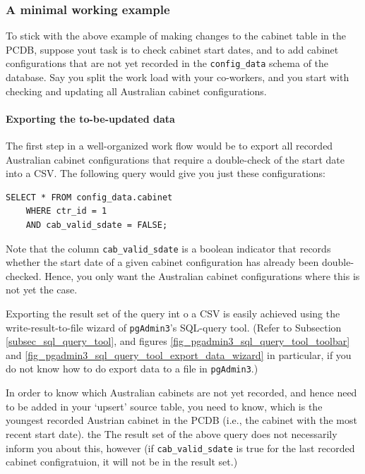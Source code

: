 \subsubsection{A minimal working example}\label{par_upsert_minimal_working_example}

To stick with the above example of making changes to the cabinet table in the PCDB, suppose yout task is to check cabinet start dates, and to add cabinet configurations that are not yet recorded in the \texttt{config\_data} schema of the database.
Say you split the work load with your co-workers, and you start with checking and updating all Australian cabinet configurations.

\paragraph{Exporting the to-be-updated data}
The first step in a well-organized work flow would be to export all recorded Australian cabinet configurations that require a double-check of the start date into a CSV.
The following query would give you just these configurations: 
\begin{lstlisting}[language=postgreSQL]
SELECT * FROM config_data.cabinet 
	WHERE ctr_id = 1
	AND cab_valid_sdate = FALSE;
\end{lstlisting}
Note that the column \texttt{cab\_valid\_sdate} is a boolean indicator that records whether the start date of a given cabinet configuration has already been double-checked. Hence, you only want the Australian cabinet configurations where this is not yet the case.

Exporting the result set of the query int o a CSV is easily achieved using the write-result-to-file wizard of \texttt{pgAdmin3}'s SQL-query tool. (Refer to Subsection \ref{subsec_sql_query_tool}, and figures \ref{fig_pgadmin3_sql_query_tool_toolbar} and \ref{fig_pgadmin3_sql_query_tool_export_data_wizard} in particular, if you do not know how to do export data to a file in \texttt{pgAdmin3}.)

In order to know which Australian cabinets are not yet recorded, and hence need to be added in your `upsert' source table, you need to know, which is the youngest recorded Austrian cabinet in the PCDB (i.e., the cabinet with the most recent start date). 
the The result set of the above query does not necessarily inform you about this,  however (if \texttt{cab\_valid\_sdate} is true for the last recorded cabinet configratuion, it will not be in the result set.)

